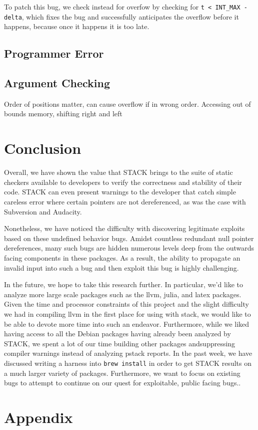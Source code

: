 \documentclass[9pt,twocolumn]{article}
\begin{document}
To patch this bug, we check instead for overfow by checking for \texttt{t < INT\_MAX - delta}, which fixes the bug and successfully anticipates the overflow before it happens, because once it happens it is too late.



\subsection{Programmer Error}

\subsection{Argument Checking}

Order of positions matter, can cause overflow if in wrong order. Accessing out of bounds memory, shifting right and left



\section{Conclusion}
\label{sec:conclusion}
Overall, we have shown the value that STACK brings to the suite of static checkers available to 
developers to verify the correctness and stability of their code. STACK can even present warnings
to the developer that catch simple careless error where certain pointers are not dereferenced, as
was the case with Subversion and Audacity. 

Nonetheless, we have noticed the difficulty with discovering legitimate exploits based on these
undefined behavior bugs. Amidst countless redundant null pointer dereferences, many such bugs
are hidden numerous levels deep from the outwards facing components in these packages. As a result,
the ability to propagate an invalid input into such a bug and then exploit this bug is highly challenging. 

In the future, we hope to take this research further. In particular, we'd like to analyze more large
scale packages such as the llvm, julia, and latex packages. Given the time and processor constraints
of this project and the slight difficulty we had in compiling llvm in the first place for using
with stack, we would like to be able to devote more time into such an endeavor. Furthermore, while we liked
having access to all the Debian packages having already been analyzed by STACK, we spent a lot of our time
building other packages andsuppressing compiler warnings instead of analyzing pstack reports. 
In the past week, we have discussed writing a harness into \texttt{brew install} in order to get STACK
results on a much larger variety of packages. Furthermore, we want to focus on existing bugs to attempt
to continue on our quest for exploitable, public facing bugs..



\section{Appendix}
\label{sec:appendix}
\end{document}
